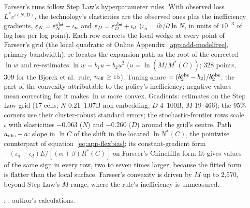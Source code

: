 \begin{table}[tp]
\begin{tablenotes}
Farseer's runs follow Step Law's hyperparameter rules. With observed loss $L^*e^{\iota(N,D)}$, the technology's elasticities are the observed ones plus the inefficiency gradients, $\varepsilon_N=\varepsilon_N^{\rm obs}+\iota_n$ and $\varepsilon_D=\varepsilon_D^{\rm obs}+\iota_d$ ($\iota_n=\partial\iota/\partial\ln N$, in units of $10^{-3}$ of log loss per log point). Each row corrects the local wedge at every point of Farseer's grid (the local quadratic of Online Appendix~\ref{app:add-modelfree}, primary bandwidth), re-locates the expansion path as the root of the corrected $\ln w$ and re-estimates $\ln w=b_1u+b_2u^2$ ($u=\ln(M/M^*(C))$; 328 points, 309 for the Bjorck et al.\ rule, $n_{\rm eff}\ge15$). Tuning share $=(b_2^{\rm obs}-b_2)/b_2^{\rm obs}$: the part of the convexity attributable to the policy's inefficiency; negative values mean correcting for it makes $\ln w$ more convex. Gradients: estimates on the Step Law grid (17 cells; $N$ 0.21--1.07B non-embedding, $D$ 4--100B, $M$ 19--466); the 95\% corners use their cluster-robust standard errors; the stochastic-frontier rows scale $\iota$ with elasticities $-0.063$ ($N$) and $-0.260$ ($D$) around the grid's centre. Path $a_{\rm obs}-a$: slope in $\ln C$ of the shift in the located $\ln N^*(C)$, the pointwise counterpart of equation~\eqref{eq:app-flexbias}; its constant-gradient form $-(\iota_n-\iota_d)E/[(\alpha+\beta)R^*(C)]$ on Farseer's Chinchilla-form fit gives values of the same sign in every row, two to seven times larger, because the fitted form is flatter than the local surface. Farseer's convexity is driven by $M$ up to 2,570, beyond Step Law's $M$ range, where the rule's inefficiency is unmeasured.
\end{tablenotes}

\begin{tablenotes}[Source]
\citet{li2025predictableb}; \citet{li2025predictablea}; author's calculations.
\end{tablenotes}
\end{table}
